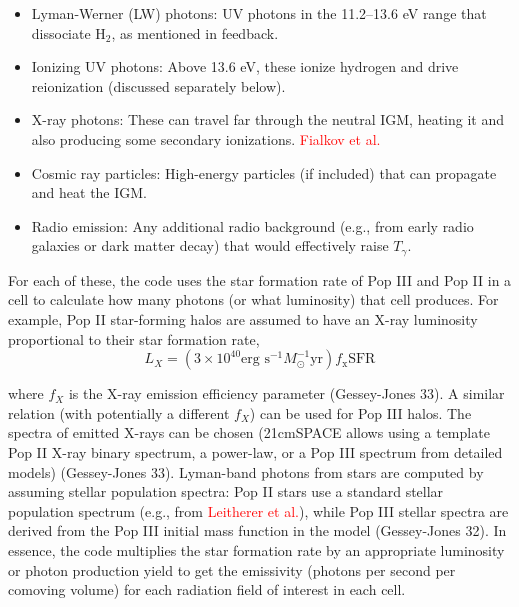 \documentclass[floats,floatfix,showpacs,amssymb,prd,superscriptaddress,nofootinbib]{revtex4-2} %
\newcommand{\red}{\textcolor{red}}
\begin{document}
\begin{enumerate}
\begin{itemize}
        \item Lyman-Werner (LW) photons: UV photons in the 11.2–13.6 eV range that dissociate $\mathrm{H}_2$, as mentioned in feedback.

        \item Ionizing UV photons: Above 13.6 eV, these ionize hydrogen and drive reionization (discussed separately below).

        \item X-ray photons: These can travel far through the neutral IGM, heating it and also producing some secondary ionizations. \red{Fialkov et al.}

        \item Cosmic ray particles: High-energy particles (if included) that can propagate and heat the IGM.

        \item Radio emission: Any additional radio background (e.g., from early radio galaxies or dark matter decay) that would effectively raise $T_\gamma$.
    \end{itemize}

    For each of these, the code uses the star formation rate of Pop III and Pop II in a cell to calculate how many photons (or what luminosity) that cell produces. For example, Pop II star-forming halos are assumed to have an X-ray luminosity proportional to their star formation rate, 
    \begin{equation}
        L_X = (3\times10^{40} \text{erg s}^{-1} M_\odot^{-1}\text{yr}) f_{\text{x}} \text{SFR}
    \end{equation}
    
    where $f_X$ is the X-ray emission efficiency parameter (Gessey-Jones 33). A similar relation (with potentially a different $f_X$) can be used for Pop III halos. The spectra of emitted X-rays can be chosen (21cmSPACE allows using a template Pop II X-ray binary spectrum, a power-law, or a Pop III spectrum from detailed models) (Gessey-Jones 33). Lyman-band photons from stars are computed by assuming stellar population spectra: Pop II stars use a standard stellar population spectrum (e.g., from \red{Leitherer et al.}), while Pop III stellar spectra are derived from the Pop III initial mass function in the model (Gessey-Jones 32). In essence, the code multiplies the star formation rate by an appropriate luminosity or photon production yield to get the emissivity (photons per second per comoving volume) for each radiation field of interest in each cell.


\end{enumerate}
\end{document}
